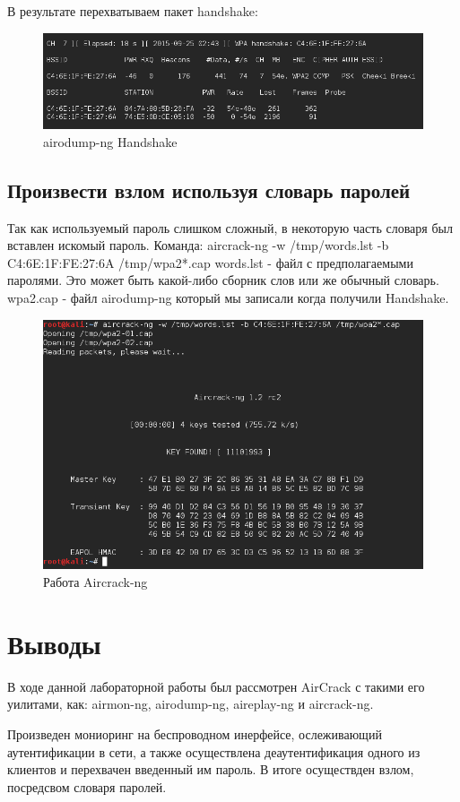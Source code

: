 \documentclass[11pt, a4paper]{article}		%
\begin{document}
В результате перехватываем пакет handshake:

\begin{figure}[h!]
	\centering
	\includegraphics[scale=0.60]{res/5}
	\caption{airodump-ng Handshake}
\end{figure}


\subsection{Произвести взлом используя словарь паролей}

Так как используемый пароль слишком сложный, в некоторую часть словаря был вставлен искомый пароль.
Команда: aircrack-ng -w /tmp/words.lst -b C4:6E:1F:FE:27:6A /tmp/wpa2*.cap
words.lst - файл с предполагаемыми паролями. Это может быть какой-либо сборник слов или же обычный словарь.
wpa2.cap - файл airodump-ng который мы записали когда получили Handshake.
\begin{figure}[h!]
	\centering
	\includegraphics[scale=0.60]{res/6}
	\caption{Работа Aircrack-ng}
\end{figure}



\section{Выводы}

В ходе данной лабораторной работы был рассмотрен AirCrack с такими его уилитами, как: airmon-ng, airodump-ng, aireplay-ng и aircrack-ng.
 
Произведен мониоринг на беспроводном инерфейсе, ослеживающий аутентификации в сети, а также осуществлена деаутентификация одного из клиентов и перехвачен введенный им пароль. В итоге осуществден взлом, посредсвом словаря паролей.
\end{document}
